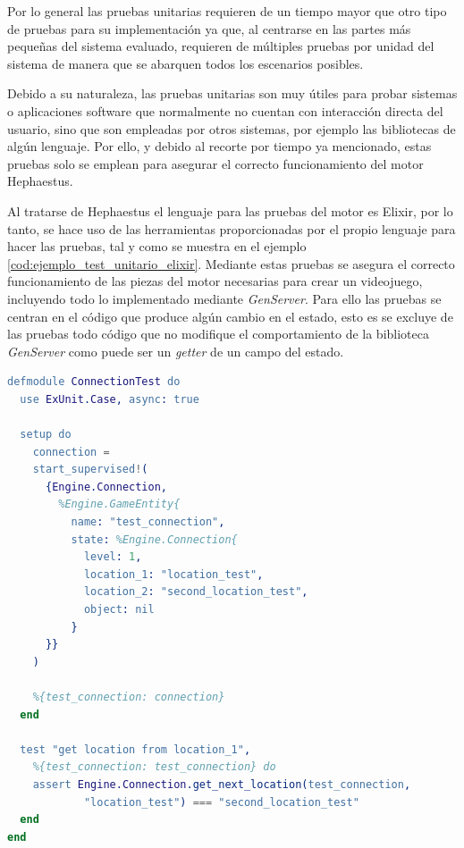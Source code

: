 Por lo general las pruebas unitarias requieren de un tiempo mayor que otro tipo de pruebas para su implementación ya que, al centrarse en las partes más pequeñas del sistema evaluado, requieren de múltiples pruebas por unidad del sistema de manera que se abarquen todos los escenarios posibles.

Debido a su naturaleza, las pruebas unitarias son muy útiles para probar sistemas o aplicaciones software que normalmente no cuentan con interacción directa del usuario, sino que son empleadas por otros sistemas, por ejemplo las bibliotecas de algún lenguaje. Por ello, y debido al recorte por tiempo ya mencionado, estas pruebas solo se emplean para asegurar el correcto funcionamiento del motor Hephaestus.

Al tratarse de Hephaestus el lenguaje para las pruebas del motor es Elixir, por lo tanto, se hace uso de las herramientas proporcionadas por el propio lenguaje para hacer las pruebas, tal y como se muestra en el ejemplo \ref{cod:ejemplo_test_unitario_elixir}. Mediante estas pruebas se asegura el correcto funcionamiento de las piezas del motor necesarias para crear un videojuego, incluyendo todo lo implementado mediante \textit{GenServer}. Para ello las pruebas se centran en el código que produce algún cambio en el estado, esto es se excluye de las pruebas todo código que no modifique el comportamiento de la biblioteca \textit{GenServer} como puede ser un \textit{getter} de un campo del estado.
\\

{\footnotesize
\begin{lstlisting}[language=erlang, caption=Snippet test unitario Elixir, label=cod:ejemplo_test_unitario_elixir, breaklines, showstringspaces=false, captionpos=b]
defmodule ConnectionTest do
  use ExUnit.Case, async: true

  setup do
    connection =
    start_supervised!(
      {Engine.Connection,
        %Engine.GameEntity{
	      name: "test_connection",
	      state: %Engine.Connection{
		    level: 1,
		    location_1: "location_test",
		    location_2: "second_location_test",
		    object: nil
	      }
      }}
    )

    %{test_connection: connection}
  end

  test "get location from location_1", 
  	%{test_connection: test_connection} do
    assert Engine.Connection.get_next_location(test_connection, 
            "location_test") === "second_location_test"
  end
end
\end{lstlisting}
}

